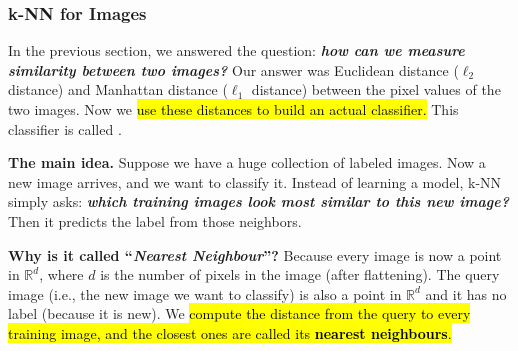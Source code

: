 \subsubsection{k-NN for Images}\label{sec:k-nn-for-images}

In the previous section, we answered the question: \emph{\textbf{how can we measure similarity between two images?}} Our answer was Euclidean distance ($\ell_2$ distance) and Manhattan distance ($\ell_1$ distance) between the pixel values of the two images. Now we \hl{use these distances to build an actual classifier.} This classifier is called .

\highspace
\textcolor{Green3}{ \textbf{The main idea.}} Suppose we have a huge collection of labeled images. Now a new image arrives, and we want to classify it. Instead of learning a model, k-NN simply asks: \emph{\textbf{which training images look most similar to this new image?}} Then it predicts the label from those neighbors.

\highspace
\textcolor{Green3}{ \textbf{Why is it called ``\emph{Nearest Neighbour}''?}} Because every image is now a point in $\mathbb{R}^{d}$, where $d$ is the number of pixels in the image (after flattening). The query image (i.e., the new image we want to classify) is also a point in $\mathbb{R}^{d}$ and it has no label (because it is new). We \hl{compute the distance from the query to every training image, and the closest ones are called its \textbf{nearest neighbours}.}

